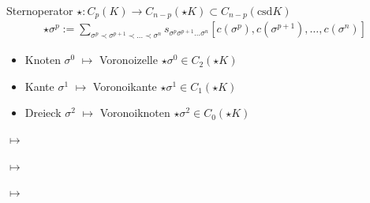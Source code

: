 \documentclass{beamer}
\newcommand{\csd}{\text{csd}}
\begin{document}
  \begin{frame}
    \begin{block}{Sternoperator \( \star: C_{p}(K) \rightarrow   C_{n-p}(\star K) \subset C_{n-p}(\csd K) \)}
      \begin{align*}
       \star\sigma^{p} := \sum_{\sigma^{p} \prec \sigma^{p+1} \prec \ldots \prec \sigma^{n}}
                                                   s_{\sigma^{p} \sigma^{p+1} \ldots \sigma^{n}} \left[ c(\sigma^{p}), c(\sigma^{p+1}), \ldots, c(\sigma^{n}) \right]
      \end{align*}
      \begin{itemize}
        \item<2-> Knoten \( \sigma^{0} \) \( \mapsto \) Voronoizelle \( \star\sigma^{0}\in C_{2}(\star K) \)
        \item<3-> Kante \( \sigma^{1} \) \( \mapsto \) Voronoikante \( \star\sigma^{1}\in C_{1}(\star K) \)
        \item<4-> Dreieck \( \sigma^{2} \) \( \mapsto \) Voronoiknoten \( \star\sigma^{2}\in C_{0}(\star K) \)
      \end{itemize}
    \end{block}
    \begin{overprint}
        \begin{minipage}{0.4\textwidth}
          \centering 
        \end{minipage}\hfill
       {\Huge\(\longmapsto\)}  \hfill
       \begin{minipage}{0.4\textwidth}
          \centering 
        \end{minipage}
        \begin{minipage}{0.4\textwidth}
          \centering 
        \end{minipage}\hfill
       {\Huge\(\longmapsto\)}  \hfill
       \begin{minipage}{0.4\textwidth}
          \centering 
        \end{minipage}
        \begin{minipage}{0.4\textwidth}
          \centering 
        \end{minipage}\hfill
       {\Huge\(\longmapsto\)}  \hfill
       \begin{minipage}{0.4\textwidth}
          \centering 
        \end{minipage}
    \end{overprint}
  \end{frame}
\end{document}
